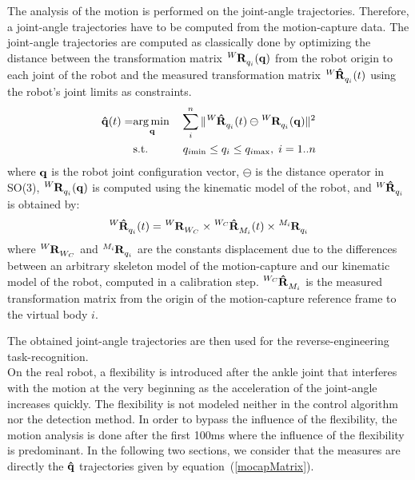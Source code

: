\documentclass[letterpaper, 10pt, conference]{ieeeconf}      %
\begin{document}
The analysis of the motion is performed on the joint-angle trajectories.
Therefore, a joint-angle trajectories have to be computed from the motion-capture data.
The joint-angle trajectories are computed as classically done by optimizing the distance
between the transformation matrix $\tensor[^{W}]{\mathbf{R}}{_{q_i}}(\mbf{q})$ from the 
robot origin to each joint of the robot and the measured
transformation matrix $\tensor[^{W}]{\mathbf{\hat{R}}}{_{q_i}}(t)$ using the robot's joint limits
as constraints. 
\begin{eqnarray}
  \mbf{\hat{q}}(t) =  & \underset{\mbf{q}}\argmin & \sum_i^n \Vert \tensor[^{W}]{\mathbf{\hat{R}}}{_{q_i}}(t) \ominus \tensor[^{W}]{\mathbf{R}}{_{q_i}}(\mbf{q}) \Vert ^2\\
    & \text{s.t.} & q_{i\mathrm{min}} \leq q_i \leq q_{i\mathrm{max}}, \; i = 1..n
  \label{mocapOpti}
\end{eqnarray}
where ${\mathbf{q}}$ is the robot joint configuration vector,
$\ominus$ is the distance operator in SO(3), 
$\tensor[^{W}]{\mathbf{R}}{_{q_i}}(\mbf{q})$ is computed using the kinematic
model of the robot, and $\tensor[^{W}]{\mathbf{\hat{R}}}{_{q_i}}$ is obtained by:
\begin{equation}
  \tensor[^{W}]{\mathbf{\hat{R}}}{_{q_i}}(t) = \tensor[^{W}]{\mathbf{R}}{_{W_{C}}} \times \tensor[^{W_{C}}]{\mathbf{\hat{R}}}{_{M_i}}(t) \times \tensor[^{M_i}]{\mathbf{R}}{_{q_i}}    
  \label{mocapMatrix}
\end{equation}
where $\tensor[^{W}]{\mathbf{R}}{_{W_{C}}}$ and $\tensor[^{M_i}]{\mathbf{R}}{_{q_i}}$ are the constants
displacement due to the differences between an arbitrary skeleton model of the motion-capture and our kinematic model of the robot,
computed in a calibration step.
$\tensor[^{W_{C}}]{\mathbf{\hat{R}}}{_{M_i}}$
is the measured transformation matrix from the origin of the motion-capture reference frame
to the virtual body $i$. 

The obtained joint-angle trajectories are then used for the reverse-engineering task-recognition.\\

On the real robot, a flexibility is introduced after the ankle joint that
interferes with the motion at the very beginning as the acceleration
of the joint-angle increases quickly. The flexibility is not modeled 
neither in the control algorithm nor the detection method.
In order to bypass the influence of the flexibility, the motion analysis is done after the first 100ms
where the influence of the flexibility is predominant.
In the following two sections, we consider that the measures are directly the ${\mathbf{\hat{q}}}$ trajectories
given by equation~(\ref{mocapMatrix}).
\end{document}
